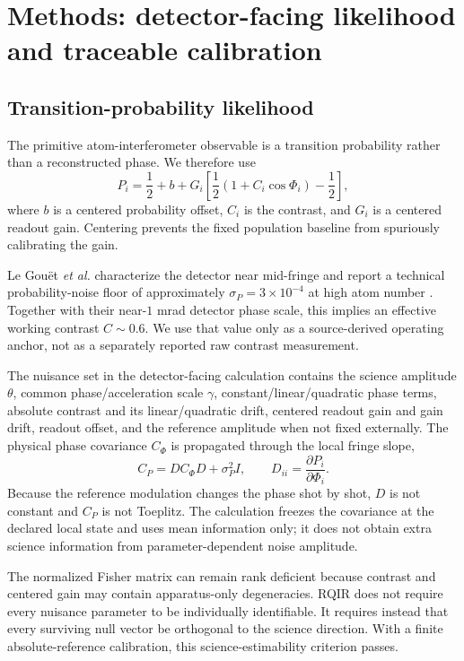 \section{Methods: detector-facing likelihood and traceable calibration}
\label{sec:detector-reference}

\subsection{Transition-probability likelihood}

The primitive atom-interferometer observable is a transition probability rather than a reconstructed phase. We therefore use
\begin{equation}
P_i=\frac{1}{2}+b+G_i\left[\frac{1}{2}(1+C_i\cos\Phi_i)-\frac{1}{2}\right],
\label{eq:probability}
\end{equation}
where $b$ is a centered probability offset, $C_i$ is the contrast, and $G_i$ is a centered readout gain. Centering prevents the fixed population baseline from spuriously calibrating the gain.

Le Gou\"et \emph{et al.} characterize the detector near mid-fringe and report a technical probability-noise floor of approximately $\sigma_P=3\times10^{-4}$ at high atom number \cite{LeGouet2008}. Together with their near-$1$ mrad detector phase scale, this implies an effective working contrast $C\sim0.6$. We use that value only as a source-derived operating anchor, not as a separately reported raw contrast measurement.

The nuisance set in the detector-facing calculation contains the science amplitude $\theta$, common phase/acceleration scale $\gamma$, constant/linear/quadratic phase terms, absolute contrast and its linear/quadratic drift, centered readout gain and gain drift, readout offset, and the reference amplitude when not fixed externally. The physical phase covariance $C_\Phi$ is propagated through the local fringe slope,
\begin{equation}
C_P=D C_\Phi D+\sigma_P^2 I,
\qquad
D_{ii}=\frac{\partial P_i}{\partial\Phi_i}.
\label{eq:prob-cov}
\end{equation}
Because the reference modulation changes the phase shot by shot, $D$ is not constant and $C_P$ is not Toeplitz. The calculation freezes the covariance at the declared local state and uses mean information only; it does not obtain extra science information from parameter-dependent noise amplitude.

The normalized Fisher matrix can remain rank deficient because contrast and centered gain may contain apparatus-only degeneracies. RQIR does not require every nuisance parameter to be individually identifiable. It requires instead that every surviving null vector be orthogonal to the science direction. With a finite absolute-reference calibration, this science-estimability criterion passes.

